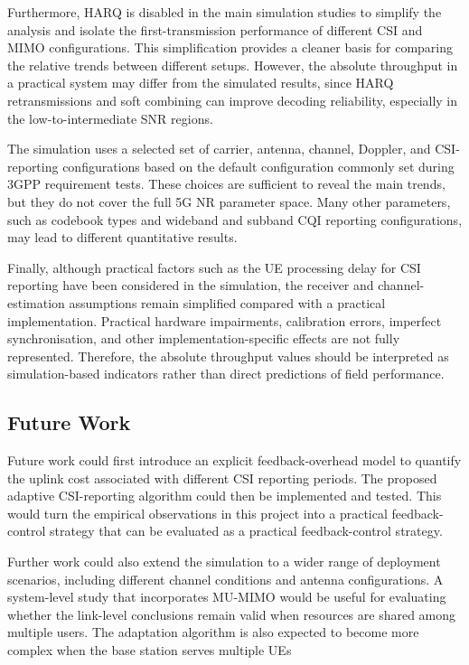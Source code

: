 \documentclass[a4paper,12pt,onecolumn]{article}
\begin{document}
		Furthermore, HARQ is disabled in the main simulation studies to simplify the analysis and isolate the first-transmission performance of different CSI and MIMO configurations. This simplification provides a cleaner basis for comparing the relative trends between different setups. However, the absolute throughput in a practical system may differ from the simulated results, since HARQ retransmissions and soft combining can improve decoding reliability, especially in the low-to-intermediate SNR regions.
	
		The simulation uses a selected set of carrier, antenna, channel, Doppler, and CSI-reporting configurations based on the default configuration commonly set during 3GPP requirement tests. These choices are sufficient to reveal the main trends, but they do not cover the full 5G NR parameter space. Many other parameters, such as codebook types and wideband and subband CQI reporting configurations, may lead to different quantitative results. 

		Finally, although practical factors such as the UE processing delay for CSI reporting have been considered in the simulation, the receiver and channel-estimation assumptions remain simplified compared with a practical implementation. Practical hardware impairments, calibration errors, imperfect synchronisation, and other implementation-specific effects are not fully represented. Therefore, the absolute throughput values should be interpreted as simulation-based indicators rather than direct predictions of field performance. 
	
	
	\subsection{Future Work}
	
		Future work could first introduce an explicit feedback-overhead model to quantify the uplink cost associated with different CSI reporting periods. The proposed adaptive CSI-reporting algorithm could then be implemented and tested. This would turn the empirical observations in this project into a practical feedback-control strategy that can be evaluated as a practical feedback-control strategy.
	
		Further work could also extend the simulation to a wider range of deployment scenarios, including different channel conditions and antenna configurations. A system-level study that incorporates MU-MIMO would be useful for evaluating whether the link-level conclusions remain valid when resources are shared among multiple users. The adaptation algorithm is also expected to become more complex when the base station serves multiple UEs
\end{document}

